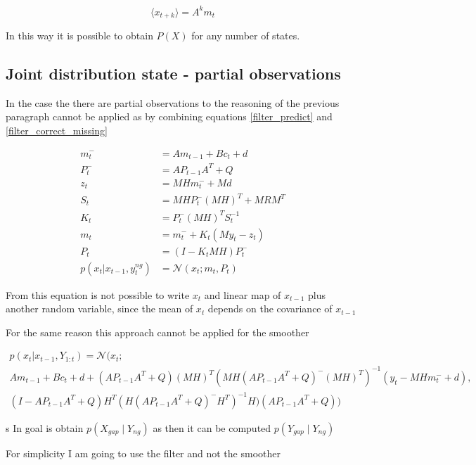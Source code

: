 \documentclass{article}
\newcommand{\E}[1]{\langle #1 \rangle} %
\begin{document}
\begin{equation}
    \E{x_{t+k}} = A^km_t
\end{equation}

In this way it is possible to obtain $P(X)$ for any number of states.

\subsection{Joint distribution state - partial observations}

In the case the there are partial observations to the reasoning of the previous paragraph cannot be applied as by combining equations \ref{filter_predict} and \ref{filter_correct_missing}

\begin{equation}\label{filter_combined}
\begin{split}
    m_t^- &= Am_{t-1} + B c_t + d\\
    P_t^- &= AP_{t-1}A^T + Q\\
    z_t &= MHm_t^- + Md\\
    S_t &= MHP_t^-(MH)^T + MRM^T\\
    K_t &= P_t^-(MH)^TS_t^{-1}\\
    m_t &= m_t^- + K_t(My_t - z_t)\\
    P_t &= (I-K_tMH)P_t^-\\
    p(x_t|x_{t-1}, y^{ng}_t) &= \mathcal{N}(x_t; m_t, P_t)
\end{split}
\end{equation}

From this equation is not possible to write $x_t$ and linear map of $x_{t-1}$ plus another random variable, since the mean of $x_t$ depends on the covariance of $x_{t-1}$ 
    
For the same reason this approach cannot be applied for the smoother




\begin{multline}
p(x_t | x_{t-1}, Y_{1:t}) = \mathcal{N}(x_t;\\Am_{t-1} + B c_t + d + (AP_{t-1}A^T + Q)(MH)^T(MH(AP_{t-1}A^T + Q)^-(MH)^T)^{-1}(y_t - MHm_t^- + d),\\ (I-AP_{t-1}A^T + Q)H^T(H(AP_{t-1}A^T + Q)^-H^T)^{-1}H)(AP_{t-1}A^T + Q))
\end{multline}

s 
In goal is obtain $ p(X_{gap} \mid Y_{ng}) $ as then it can be computed  $p(Y_{gap} \mid Y_{ng}) $

For simplicity I am going to use the filter and not the smoother
\end{document}
